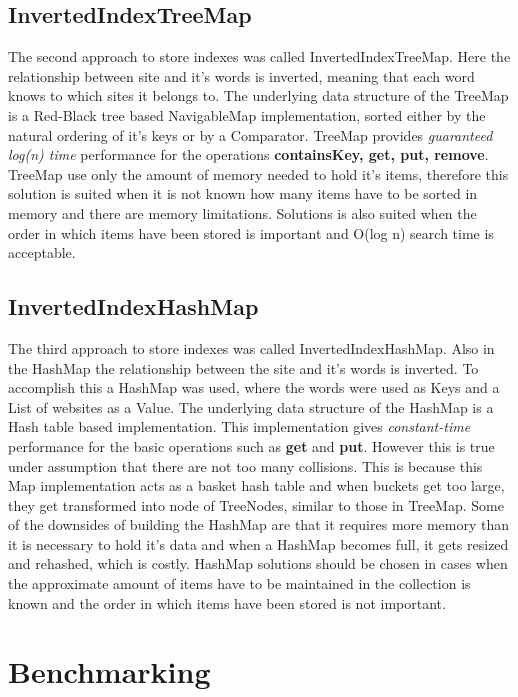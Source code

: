 \subsection{InvertedIndexTreeMap}
The second approach to store indexes was called InvertedIndexTreeMap. Here the relationship between site and it's words is inverted, meaning that each word knows to which sites it belongs to. The underlying data structure of the TreeMap is a Red-Black tree based NavigableMap implementation, sorted either by the natural ordering of it's keys or by a Comparator. TreeMap provides \textit{guaranteed log(n) time} performance for the operations \textbf{containsKey, get, put, remove}.\cite{oracle:treemap} TreeMap use only the amount of memory needed to hold it's items, therefore this solution is suited when it is not known how many items have to be sorted in memory and there are memory limitations. Solutions is also suited when the order in which items have been stored is important and O(log n) search time is acceptable. \cite{baeldung:HashTreeCompared}

\subsection{InvertedIndexHashMap}
The third approach to store indexes was called InvertedIndexHashMap. Also in the HashMap the relationship between the site and it's words is inverted. To accomplish this a HashMap was used, where the words were used as Keys and  a List of websites as a Value.
The underlying data structure of the HashMap is a Hash table based implementation. This implementation gives \textit{constant-time} performance for the basic operations such as \textbf{get} and \textbf{put}. \cite{oracle:hashmap} However this is true under assumption that there are not too many collisions. This is because this Map implementation acts as a basket hash table and when buckets get too large, they get transformed into node of  TreeNodes, similar to those in TreeMap. \cite{baeldung:HashTreeCompared} Some of the downsides of building the HashMap are that it requires more memory than it is necessary to hold it's data and when a HashMap becomes full, it gets resized and rehashed, which is costly. HashMap solutions should be chosen in cases when the approximate amount of items have to be maintained in the collection is known and the order in which items have been stored is not important. \cite{baeldung:HashTreeCompared}


\section{Benchmarking}

